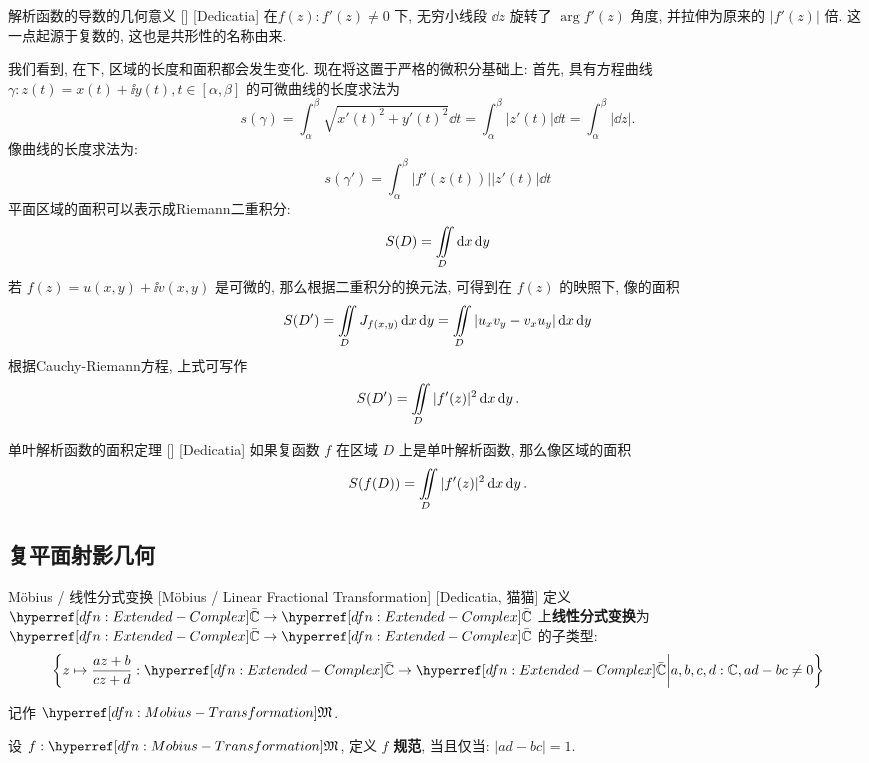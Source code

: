         \begin{crl}
            {解析函数的导数的几何意义}
            []
            [Dedicatia]
            在\ConformalMapping  \(f(z): f'(z)\neq 0\) 下, 无穷小线段 \(\dd{z}\) 旋转了 \(\arg f'(z)\) 角度, 并拉伸为原来的 \(|f'(z)|\) 倍. 这一点起源于复数的\AngularForm, 这也是共形性的名称由来. 
        \end{crl}

        \begin{rmk}
            [Dedicatia]
            我们看到, 在\ConformalMapping 下, 区域的长度和面积都会发生变化. 现在将这置于严格的微积分基础上: 首先, 具有方程曲线 \(\gamma:z(t)=x(t)+\ii y(t), t\in[\alpha,\beta]\) 的可微曲线的长度求法为
            \[s(\gamma)=\int_\alpha^\beta\sqrt{x'(t)^2+y'(t)^2}\dd{t}=\int_{\alpha}^{\beta}|z'(t)|\dd{t}=\int_{\alpha}^\beta|\dd{z}|. \]
            像曲线的长度求法为: 
            \[s(\gamma')=\int_{\alpha}^{\beta}|f'(z(t))||z'(t)|\dd{t}\]
            平面区域的面积可以表示成Riemann二重积分: 
            \[S(D)=\iintop_D\dd{x}\dd{y}\]
            若 \(f(z)=u(x,y)+\ii v(x,y)\) 是可微的, 那么根据二重积分的换元法, 可得到在 \(f(z)\) 的映照下, 像的面积
            \[S(D')=\iintop_{D} J_{f(x,y)}\dd{x}\dd{y}=\iintop_{D}|u_xv_y-v_xu_y|\dd{x}\dd{y}\]
            根据Cauchy-Riemann方程, 上式可写作
            \[S(D')=\iintop_{D}|f'(z)|^2\dd{x}\dd{y}.\]
        \end{rmk}

        \begin{thm}
            {单叶解析函数的面积定理}
            []
            [Dedicatia]
            如果复函数 \(f\) 在区域 \(D\) 上是单叶解析函数, 那么像区域的面积
            \[S(f(D))=\iintop_{D}|f'(z)|^2\dd{x}\dd{y}.\]
        \end{thm}

    \subsection{复平面射影几何}

        \begin{dfn}
            {M\"obius / 线性分式变换}
            [M\"obius / Linear Fractional Transformation]
            [Dedicatia, 猫猫]
            定义 \(\barC\to\barC\) 上\textbf{线性分式变换}为 \(\barC\to\barC\) 的子类型: 
            \[\left\{z\mapsto\frac{az+b}{cz+d}:\barC\to\barC\middle|a,b,c,d:\C, ad-bc\neq 0\right\}\]

            记作 \(\Mobius\). 

            设 \(f:\Mobius\), 定义 \(f\) \textbf{规范}, 当且仅当: \(|ad-bc|=1\). 
        \end{dfn}
        
